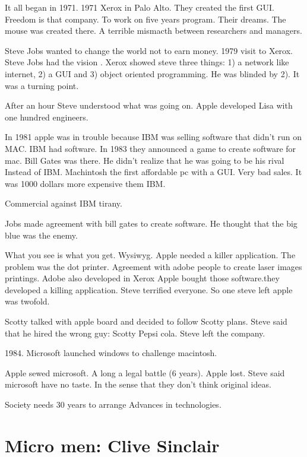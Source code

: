   It all began in 1971. 
  1971 Xerox in Palo Alto. They created the first GUI. Freedom is that company. To work on five years program. Their dreams. The mouse was 
  created there. A terrible mismacth between researchers and managers. 
  
  Steve Jobs wanted to change the world not to earn money. 1979 visit to Xerox. 
  Steve Jobs had the vision . Xerox showed steve three things: 1) a network like internet, 2) a GUI and  3) object oriented programming. He 
  was blinded by 2). It was a turning point. 
  
  After an hour Steve understood what was going on. Apple developed Lisa with one hundred engineers. 
  
  In 1981 apple was in trouble because IBM was selling software that didn't run on MAC. IBM had software. In 1983 they announced a game to 
  create software for mac. Bill Gates was there. He didn't realize that he was going to be his rival Instead of IBM. Machintosh the first 
  affordable pc with a GUI. Very bad sales. It was 1000 dollars more expensive them IBM. 
  
  Commercial against IBM tirany. 
  
  Jobs made agreement with bill gates to create software. He thought that the big blue was the enemy. 
  
  
  What you see is what you get. 
  Wysiwyg. Apple needed a killer application. 
  The problem was the dot printer. Agreement with adobe people to create laser images printings. 
  Adobe also developed in Xerox 
  Apple bought those software.they developed a killing application. Steve terrified everyone. So one steve left apple was twofold. 
  
  Scotty talked with apple board and decided to follow Scotty plans. 
  Steve said that he hired the wrong guy: Scotty Pepsi cola.  Steve left the company. 
  
  1984. Microsoft launched windows to challenge macintosh.  
  
  Apple sewed microsoft. A long a legal battle (6 years). 
   Apple lost. 
  Steve said microsoft have no taste. 
  In the sense that they don't think original ideas. 
  
  Society needs 30 years to arrange Advances in technologies. 
  
  
  
   
   \section{Micro men: Clive Sinclair} 
   
